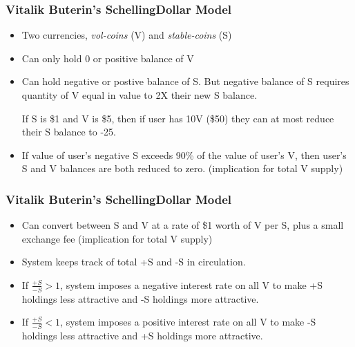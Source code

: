 \documentclass{beamer}
\begin{document}
\begin{frame}
  \frametitle{Vitalik Buterin's SchellingDollar Model}
  \begin{itemize}
  \item Two currencies, \emph{vol-coins} (V) and \emph{stable-coins} (S)
  \item Can only hold 0 or positive balance of V
  \item Can hold negative or postive balance of S. But negative
    balance of S requires quantity of V equal in value to 2X their new
    S balance. 
    \begin{example}
      If S is \$1 and V is \$5, then if user has 10V (\$50) they can
      at most reduce their S balance to -25.
    \end{example}
  \item If value of user's negative S exceeds 90\% of the value of
    user's V, then user's S and V balances are both reduced to
    zero. (implication for total V supply)
  \end{itemize}
\end{frame}


\begin{frame}
  \frametitle{Vitalik Buterin's SchellingDollar Model}

  \begin{itemize}
  \item Can convert between S and V at a rate of \$1 worth of V per
    S, plus a small exchange fee (implication for total V supply)
  \item System keeps track of total +S and -S in circulation.
  \item If $\frac{+S}{-S} > 1$, system imposes a negative interest rate on all
    V to make +S holdings less attractive and -S holdings more
    attractive.
  \item If $\frac{+S}{-S} < 1$, system imposes a positive interest rate on all
    V to make -S holdings less attractive and +S holdings more
    attractive.
  \end{itemize}
\end{frame}
\end{document}
